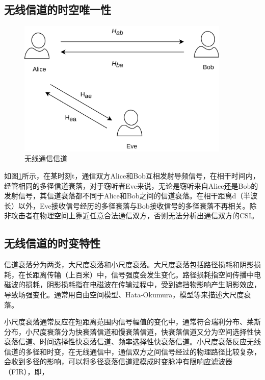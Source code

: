\documentclass[master]{seuthesis} %
\begin{document}
\begin{Main}
\subsection{无线信道的时空唯一性}

\begin{figure}[htbp!]
    \centering \includegraphics[width=0.9\textwidth]{images/channel} 
    \caption{无线通信信道}
    \label{wireless-channel}
\end{figure}

如图\ref{wireless-channel}所示，在某时刻t，通信双方Alice和Bob互相发射导频信号，在相干时间内，经管相同的多径信道衰落，对于窃听者Eve来说，无论是窃听来自Alice还是Bob的发射信号，其信道衰落都不同于Alice和Bob之间的信道衰落。在相干距离d（半波长）以外，Eve接收信号经历的多径衰落与Bob接收信号的多径衰落不再相关。除非攻击者在物理空间上靠近任意合法通信双方，否则无法分析出通信双方的CSI\cite{sasaoka2009secret}。

\subsection{无线信道的时变特性}


信道衰落分为两类，大尺度衰落和小尺度衰落。大尺度衰落包括路径损耗和阴影损耗，在长距离传输（上百米）中，信号强度会发生变化。路径损耗指空间传播中电磁波的损耗，阴影损耗指在电磁波在传输过程中，受到遮挡物影响产生阴影效应，导致场强变化。通常用自由空间模型、Hata-Okumura，模型等来描述大尺度衰落。

小尺度衰落通常反应在短距离范围内信号幅值的变化中，通常符合瑞利分布、莱斯分布，小尺度衰落分为快衰落信道和慢衰落信道，快衰落信道又分为空间选择性快衰落信道、时间选择性快衰落信道、频率选择性快衰落信道。小尺度衰落反应无线信道的多径和时变，在无线通信中，通信双方之间信号经过的物理路径比较复杂，会收到多径的影响，可以将多径衰落信道建模成时变脉冲有限响应滤波器（FIR），即，


\end{Main}
\end{document}
